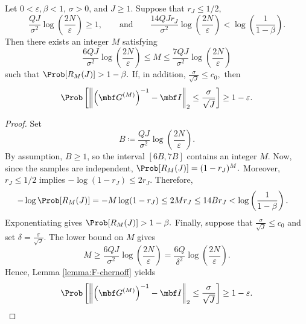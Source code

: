 \documentclass[10pt,dvipsnames]{amsart}
\begin{document}
\begin{lemma}
\label{lemma:admissible-M-window}
Let \(0<\varepsilon,\beta<1\), \(\sigma>0\), and \(J\geq1\). Suppose that
\(r_J\leq1/2\),
\begin{equation}\label{eq:window-compatibility-condition}
    \frac{QJ}{\sigma^2}
    \log\left(\frac{2N}{\varepsilon}\right)
    \geq1,
    \qquad 
    \text{and}
    \qquad
    \frac{14QJr_J}{\sigma^2}
    \log\left(\frac{2N}{\varepsilon}\right)
    <
    \log\left(\frac{1}{1-\beta}\right).
\end{equation}
Then there exists an integer \(M\) satisfying
\begin{equation}\label{eq:window-length-condition}
    \frac{6QJ}{\sigma^2}
    \log\left(\frac{2N}{\varepsilon}\right)
    \leq M
    \leq
    \frac{7QJ}{\sigma^2}
    \log\left(\frac{2N}{\varepsilon}\right)
\end{equation}
such that
\(
    \Prob[R_M(J)]>1-\beta.
\)
If, in addition,
\(
    \frac{\sigma}{\sqrt J}\leq c_0,
\)
then
\[
    \Prob\left[
        \left\|
            \left(\mbf G^{(M)}\right)^{-1}-\mbf I
        \right\|_2
        \leq
        \frac{\sigma}{\sqrt J}
    \right]
    \geq
    1-\varepsilon.
\]
\end{lemma}

\begin{proof}
Set
\[
    B
    \coloneqq
    \frac{QJ}{\sigma^2}
    \log\left(\frac{2N}{\varepsilon}\right).
\]
By assumption, \(B\geq1\), so the interval \([6B,7B]\) contains an integer \(M\). 
Now, since the samples are independent,
\(
    \Prob[R_M(J)]
    =
    (1-r_J)^M.
\)
Moreover, \(r_J\leq1/2\) implies
\(
    -\log(1-r_J)\leq2r_J.
\)
Therefore,
\begin{align*}
    -\log\Prob[R_M(J)]
    &=
    -M\log(1-r_J) 
    \leq
    2Mr_J 
    \leq
    14Br_J 
    <
    \log\left(\frac{1}{1-\beta}\right).
\end{align*}
Exponentiating gives
\(
    \Prob[R_M(J)]>1-\beta.
\)
Finally, suppose that
\(
    \frac{\sigma}{\sqrt J}\leq c_0
\)
and set
\(
    \delta
    =
    \frac{\sigma}{\sqrt J}.
\)
The lower bound on \(M\) gives
\[
    M
    \geq
    \frac{6QJ}{\sigma^2}
    \log\left(\frac{2N}{\varepsilon}\right)
    =
    \frac{6Q}{\delta^2}
    \log\left(\frac{2N}{\varepsilon}\right).
\]
Hence, Lemma \ref{lemma:F-chernoff} yields
\[
    \Prob\left[
        \left\|
            \left(\mbf G^{(M)}\right)^{-1}-\mbf I
        \right\|_2
        \leq
        \frac{\sigma}{\sqrt J}
    \right]
    \geq
    1-\varepsilon.
\]
\end{proof}
\end{document}
